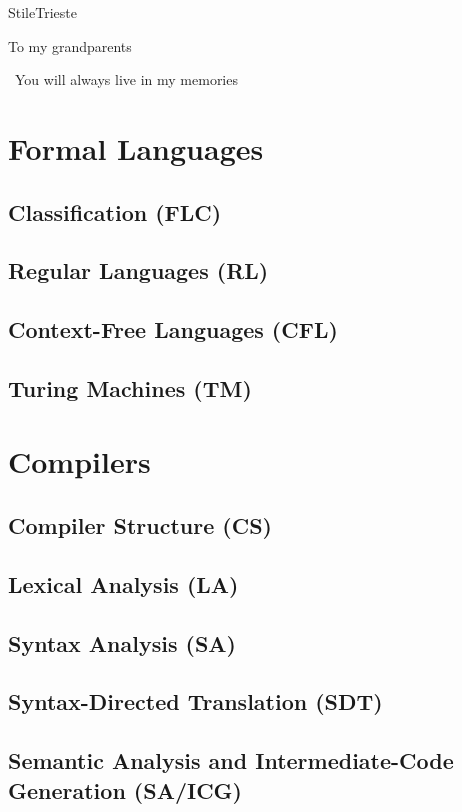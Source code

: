 \documentclass[pdfa,cucitura]{toptesi}
\begin{document}
\english


\expandafter\ifx\csname StileTrieste\endcsname\relax
\else
	\paginavuota
	\begin{dedica}
		To my grandparents

		\textdagger\ You will always live in my memories
	\end{dedica}
	\tomo
\fi

\sommario


\indici

\mainmatter

\part{Formal Languages}

\chapter{Classification (FLC)}


\chapter{Regular Languages (RL)}


\chapter{Context-Free Languages (CFL)}

\chapter{Turing Machines (TM)}

\part{Compilers}

\chapter{Compiler Structure (CS)}

\chapter{Lexical Analysis (LA)}

\chapter{Syntax Analysis (SA)}

\chapter{Syntax-Directed Translation (SDT)}

\chapter{Semantic Analysis and Intermediate-Code Generation (SA/ICG)}
\end{document}
